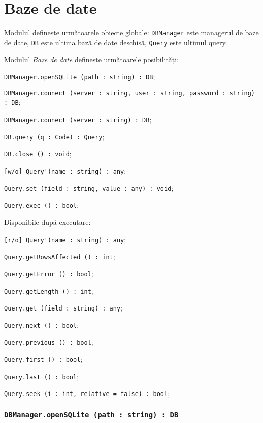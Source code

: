 \section{Baze de date}

Modulul definește următoarele obiecte globale: \lstinline|DBManager| este managerul de baze de date, \lstinline|DB| este ultima bază de date deschisă, \lstinline|Query| este ultimul query.

Modulul \textit{Baze de date} definește următoarele posibilități:
\begin{icItems}
	\item \lstinline|DBManager.openSQLite (path : string) : DB|;
	\item \lstinline|DBManager.connect (server : string, user : string, password : string) : DB|;
	\item \lstinline|DBManager.connect (server : string) : DB|;
	\item \lstinline|DB.query (q : Code) : Query|;
	\item \lstinline|DB.close () : void|;
	\item \lstinline|[w/o] Query'(name : string) : any|;
	\item \lstinline|Query.set (field : string, value : any) : void|;
	\item \lstinline|Query.exec () : bool|;
	\item Disponibile după executare:
	\begin{icItems}
		\item \lstinline|[r/o] Query'(name : string) : any|;
		\item \lstinline|Query.getRowsAffected () : int|;
		\item \lstinline|Query.getError () : bool|;
		\item \lstinline|Query.getLength () : int|;
		\item \lstinline|Query.get (field : string) : any|;
		\item \lstinline|Query.next () : bool|;
		\item \lstinline|Query.previous () : bool|;
		\item \lstinline|Query.first () : bool|;
		\item \lstinline|Query.last () : bool|;
		\item \lstinline|Query.seek (i : int, relative = false) : bool|;
	\end{icItems}
\end{icItems}

\subsubsection{\lstinline|DBManager.openSQLite (path : string) : DB|}

